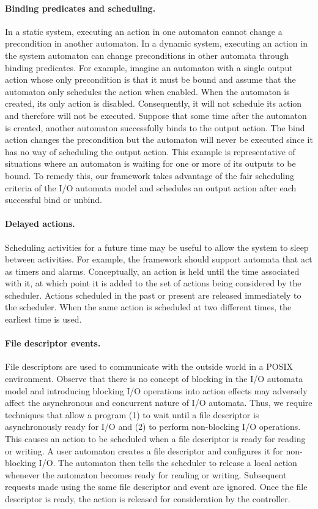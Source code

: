 \paragraph*{Binding predicates and scheduling.}
In a static system, executing an action in one automaton cannot change a precondition in another automaton.
In a dynamic system, executing an action in the system automaton can change preconditions in other automata through binding predicates.
For example, imagine an automaton with a single output action whose only precondition is that it must be bound and assume that the automaton only schedules the action when enabled.
When the automaton is created, its only action is disabled.
Consequently, it will not schedule its action and therefore will not be executed.
Suppose that some time after the automaton is created, another automaton successfully binds to the output action.
The bind action changes the precondition but the automaton will never be executed since it has no way of scheduling the output action.
This example is representative of situations where an automaton is waiting for one or more of its outputs to be bound.
To remedy this, our framework takes advantage of the fair scheduling criteria of the I/O automata model and schedules an output action after each successful bind or unbind.

\paragraph*{Delayed actions.}
Scheduling activities for a future time may be useful to allow the system to sleep between activities.
For example, the framework should support automata that act as timers and alarms.
Conceptually, an action is held until the time associated with it, at which point it is added to the set of actions being considered by the scheduler.
Actions scheduled in the past or present are released immediately to the scheduler.
When the same action is scheduled at two different times, the earliest time is used.

\paragraph*{File descriptor events.}
File descriptors are used to communicate with the outside world in a POSIX environment.
Observe that there is no concept of blocking in the I/O automata model and introducing blocking I/O operations into action effects may adversely affect the asynchronous and concurrent nature of I/O automata.
Thus, we require techniques that allow a program (1) to wait until a file descriptor is asynchronously ready for I/O and (2) to perform non-blocking I/O operations.
This causes an action to be scheduled when a file descriptor is ready for reading or writing.
A user automaton creates a file descriptor and configures it for non-blocking I/O.
The automaton then tells the scheduler to release a local action whenever the automaton becomes ready for reading or writing.
Subsequent requests made using the same file descriptor and event are ignored.
Once the file descriptor is ready, the action is released for consideration by the controller.

